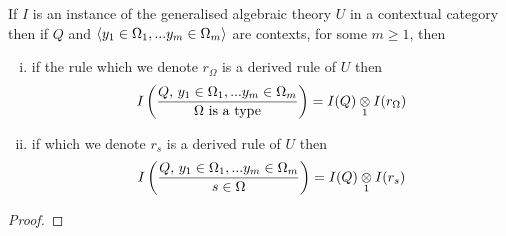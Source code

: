 \begin{lemma}
If $I$ is an instance of the generalised algebraic theory $U$ in a contextual category \catcw then
if  $Q$ and $\encyOmega{m}$ are contexts, for some $m \geq 1$,  then
\begin{enumerate}[(i)]
\item if the rule \ZOmega which we denote $r_\Omega$ is a derived rule of $U$ then
$$\displaystyle\Imappedrule{Q,\, \yOmega{m}}{\isT{\Omega}}=\crossx{I(Q)}{I(r_\Omega)}{1}$$
\item if \ZsOmega which we denote $r_s$ is a derived rule of $U$ then 
$$\displaystyle\Imappedrule{Q,\, \yOmega{m}}{\ofT{s}{\Omega}}=\crossx{I(Q)}{I(r_s)}{1}$$
\end{enumerate}
\end{lemma}
\begin{proof}
\tbd
\end{proof}